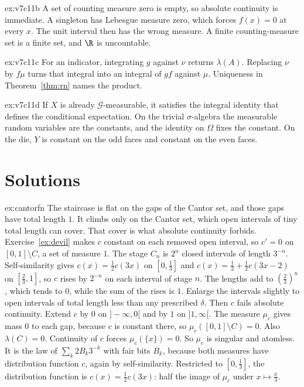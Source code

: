 \begin{hint}{ex:v7c11b}
A set of counting measure zero is empty, so absolute continuity is immediate. A singleton has Lebesgue measure zero, which forces $f(x)=0$ at every $x$. The unit interval then has the wrong measure. A finite counting-measure set is a finite set, and $\R$ is uncountable.
\end{hint}
\begin{hint}{ex:v7c11c}
For an indicator, integrating $g$ against $\nu$ returns $\lambda(A)$. Replacing $\nu$ by $f\mu$ turns that integral into an integral of $gf$ against $\mu$. Uniqueness in Theorem~\ref{thm:rn} names the product.
\end{hint}
\begin{hint}{ex:v7c11d}
If $X$ is already $\mathcal G$-measurable, it satisfies the integral identity that defines the conditional expectation. On the trivial $\sigma$-algebra the measurable random variables are the constants, and the identity on $\Omega$ fixes the constant. On the die, $Y$ is constant on the odd faces and constant on the even faces.
\end{hint}

\section{Solutions}

\begin{solution}{ex:cantorfn}
\idea The staircase is flat on the gaps of the Cantor set, and those gaps have total length $1$. It climbs only on the Cantor set, which open intervals of tiny total length can cover. That cover is what absolute continuity forbids.
\writeup Exercise~\ref{ex:devil} makes $c$ constant on each removed open interval, so $c'=0$ on $[0,1]\setminus C$, a set of measure $1$. The stage $C_n$ is $2^n$ closed intervals of length $3^{-n}$. Self-similarity gives $c(x)=\frac12c(3x)$ on $[0,\frac13]$ and $c(x)=\frac12+\frac12c(3x-2)$ on $[\frac23,1]$, so $c$ rises by $2^{-n}$ on each interval of stage $n$. The lengths add to $(\frac23)^n$, which tends to $0$, while the sum of the rises is $1$. Enlarge the intervals slightly to open intervals of total length less than any prescribed $\delta$. Then $c$ fails absolute continuity. Extend $c$ by $0$ on $]-\infty,0[$ and by $1$ on $]1,\infty[$. The measure $\mu_c$ gives mass $0$ to each gap, because $c$ is constant there, so $\mu_c([0,1]\setminus C)=0$. Also $\lambda(C)=0$. Continuity of $c$ forces $\mu_c(\{x\})=0$. So $\mu_c$ is singular and atomless. It is the law of $\sum_k2B_k3^{-k}$ with fair bits $B_k$, because both measures have distribution function $c$, again by self-similarity. Restricted to $[0,\frac13]$, the distribution function is $c(x)=\frac12c(3x)$: half the image of $\mu_c$ under $x\mapsto\frac x3$.
\end{solution}

